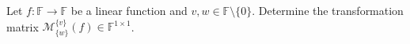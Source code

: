 Let $f\colon\mathbb{F} \to \mathbb{F}$ be a linear function and $v,w \in \mathbb{F}\setminus \{0\}$. Determine the transformation matrix $\mathcal{M}^{\{v\}}_{\{w\}}(f) \in \mathbb{F}^{1 \times 1}$.\\

